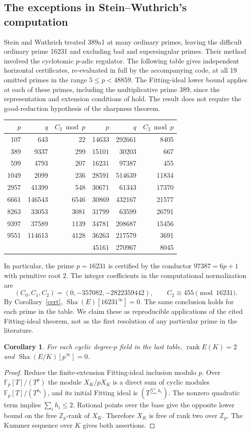 \documentclass[11pt]{article}
\newtheorem{corollary}[theorem]{Corollary}
\theoremstyle{remark}\newtheorem{remark}[theorem]{Remark}
\newcommand{\Z}{\mathbb Z}\newcommand{\Q}{\mathbb Q}\newcommand{\F}{\mathbb F}
\newcommand{\Sha}{\operatorname{Sha}}
\newcommand{\rk}{\operatorname{rank}}
\begin{document}
\subsection{The exceptions in Stein--Wuthrich's computation}
Stein and Wuthrich \cite[Thm.~12.3, Rem.~12.4]{SW} treated 389a1 at many ordinary primes, leaving the difficult ordinary prime 16231 and excluding bad and supersingular primes. Their method involved the cyclotomic $p$-adic regulator. The following table gives independent horizontal certificates, re-evaluated in full by the accompanying code, at all 19 omitted primes in the range $5\leq p<48859$. The Fitting-ideal lower bound applies at each of these primes, including the multiplicative prime 389, since the representation and extension conditions of \cite[Hyp.~1.2]{BH} hold. The result does not require the good-reduction hypothesis of the sharpness theorem.

\begin{center}
\begin{tabular}{rrr@{\qquad}rrr}
\toprule
$p$ & $q$ & $C_2\bmod p$ & $p$ & $q$ & $C_2\bmod p$\\ \midrule
107&643&22&14633&292661&8405\\
389&9337&299&15101&30203&667\\
599&4793&207&16231&97387&455\\
1049&2099&236&28591&514639&11834\\
2957&41399&548&30671&61343&17370\\
6661&146543&6546&30869&432167&21577\\
8263&33053&3081&31799&63599&26791\\
9397&37589&1139&34781&208687&15456\\
9551&114613&4128&36263&217579&3691\\
&&&45161&270967&8045\\
\bottomrule
\end{tabular}
\end{center}
In particular, the prime $p=16231$ is certified by the conductor $97387=6p+1$ with primitive root $2$. The integer coefficients in the computational normalization are
\[
 (C_0,C_1,C_2)=(0,-357082,-2822359442),
 \qquad C_2\equiv455\pmod{16231}.
\]
By Corollary~\ref{cert}, $\Sha(E)[16231^\infty]=0$. The same conclusion holds for each prime in the table. We claim these as reproducible applications of the cited Fitting-ideal theorem, not as the first resolution of any particular prime in the literature.

\begin{corollary}
For each cyclic degree-$p$ field in the last table, $\rk E(K)=2$ and $\Sha(E/K)[p^\infty]=0$.
\end{corollary}
\begin{proof}
Reduce the finite-extension Fitting-ideal inclusion modulo $p$. Over $\F_p[T]/(T^p)$ the module $X_K/pX_K$ is a direct sum of cyclic modules $\F_p[T]/(T^{h_i})$, and its initial Fitting ideal is $(T^{\sum_i h_i})$. The nonzero quadratic term implies $\sum_i h_i\leq2$. Rational points over the base give the opposite lower bound on the free $\Z_p$-rank of $X_K$. Therefore $X_K$ is free of rank two over $\Z_p$. The Kummer sequence over $K$ gives both assertions.
\end{proof}
\end{document}
